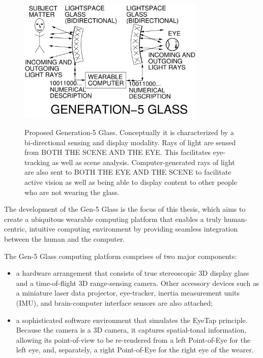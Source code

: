 \begin{figure}
  \centering
  \includegraphics[width=3.5in]{ch6/figs/GL455.pdf}\\
  \caption{Proposed Generation-5 Glass.  Conceptually it is characterized
           by a bi-directional sensing and display modality.  Rays of light
           are sensed from BOTH THE SCENE AND THE EYE.  This facilitates
           eye-tracking as well as scene analysis. Computer-generated rays of light are also sent to 
BOTH THE
           EYE AND THE SCENE to facilitate active vision as well as
           being able to display content to other people who are not wearing
           the glass.}
  \label{fig:genfive}
\end{figure}

The development of the Gen-5 Glass is the focus of this thesis, which aims to create a ubiquitous 
wearable computing platform that enables a truly human-centric, intuitive computing environment by 
providing seamless integration between the human and the computer.

The Gen-5 Glass computing platform comprises of two major components:
\begin{itemize}
  \item a hardware arrangement that consists of true stereoscopic 3D display glass and a time-of-flight 
3D range-sensing camera.  Other accessory devices such as a
        miniature laser data projector, eye-tracker, inertia measurement units (IMU), and brain-computer 
interface   sensors are also attached;
  \item a sophisticated software environment that simulates the EyeTap
        principle.  Because the camera is a 3D camera, it captures spatial-tonal
        information, allowing its point-of-view to be re-rendered from a
        left Point-of-Eye for the left eye, and, separately, a
        right Point-of-Eye for the right eye of the wearer.
\end{itemize}

